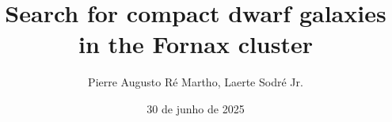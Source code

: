 
\title[]{Search for compact dwarf galaxies in the Fornax cluster}

\author[pierre@usp.br]{Pierre Augusto Ré Martho, Laerte Sodré Jr.} %
\date{30 de junho de 2025}



{
    \begin{frame}[plain]
        \vspace{-1cm}
        \titlepage
    \end{frame}
}